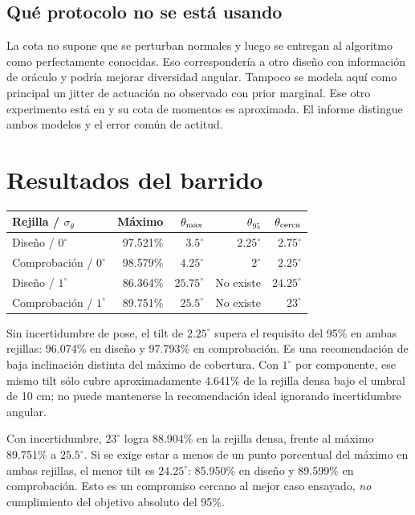 \documentclass[11pt,a4paper]{article}
\begin{document}
\subsection{Qué protocolo no se está usando}
La cota no supone que se perturban normales y luego se entregan al algoritmo como perfectamente conocidas. Eso correspondería a otro diseño con información de oráculo y podría mejorar diversidad angular. Tampoco se modela aquí como principal un jitter de actuación no observado con prior marginal. Ese otro experimento está en  y su cota de momentos es aproximada. El informe  distingue ambos modelos y el error común de actitud.

\section{Resultados del barrido}
\begin{center}\small
\begin{tabular}{lrrrr}
\toprule
Rejilla / $\sigma_\theta$ & Máximo & $\theta_{\rm max}$ & $\theta_{95}$ & $\theta_{\rm cerca}$ \\
\midrule
Diseño / $0^\circ$ & 97.521\% & $3.5^\circ$ & $2.25^\circ$ & $2.75^\circ$ \\
Comprobación / $0^\circ$ & 98.579\% & $4.25^\circ$ & $2^\circ$ & $2.25^\circ$ \\
Diseño / $1^\circ$ & 86.364\% & $25.75^\circ$ & No existe & $24.25^\circ$ \\
Comprobación / $1^\circ$ & 89.751\% & $25.5^\circ$ & No existe & $23^\circ$ \\
\bottomrule
\end{tabular}
\end{center}
Sin incertidumbre de pose, el tilt de $2.25^\circ$ supera el requisito del 95\% en ambas rejillas: 96.074\% en diseño y 97.793\% en comprobación. Es una recomendación de baja inclinación distinta del máximo de cobertura. Con $1^\circ$ por componente, ese mismo tilt sólo cubre aproximadamente 4.641\% de la rejilla densa bajo el umbral de 10 cm; no puede mantenerse la recomendación ideal ignorando incertidumbre angular.

Con incertidumbre, $23^\circ$ logra 88.904\% en la rejilla densa, frente al máximo 89.751\% a $25.5^\circ$. Si se exige estar a menos de un punto porcentual del máximo en ambas rejillas, el menor tilt es $24.25^\circ$: 85.950\% en diseño y 89.599\% en comprobación. Esto es un compromiso cercano al mejor caso ensayado, \emph{no} cumplimiento del objetivo absoluto del 95\%.
\end{document}
